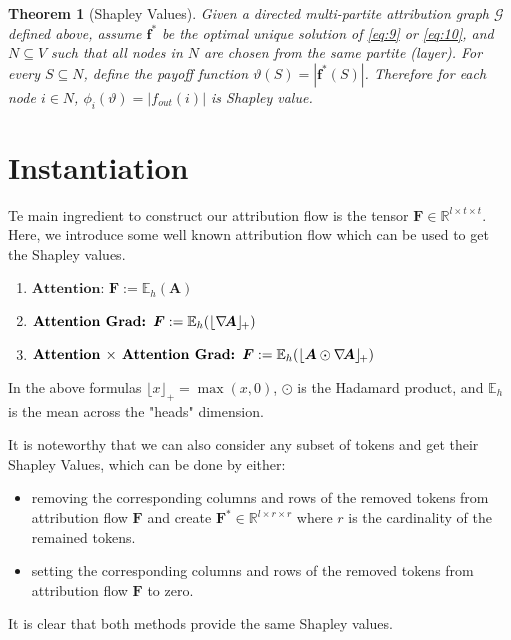 \documentclass{article} %
\theoremstyle{bfnote}
\newtheorem{theorem}{Theorem}[section]
\begin{document}
\begin{theorem}[Shapley Values]
	Given a directed multi-partite attribution graph $\mathcal{G}$ defined above, assume $\bm{f}^{\ast}$ be the optimal unique solution of \cref{eq:9}  or \cref{eq:10}, and $N \subseteq V$ such that all nodes in $N$ are chosen from the same partite (layer). For every  $S \subseteq N$, define the payoff function $\vartheta(S)=|\bm{f}^{\ast}(S)|$. Therefore for each node $i \in N$, $\phi_i(\vartheta)= |f_{out}(i)|$ is Shapley value.
\end{theorem}


\section{Instantiation}
Te main ingredient to construct our attribution flow is the tensor  $\bm{F} \in \mathbb{R}^{l \times t \times t}$. Here, we introduce some well known attribution flow which can be used to get the Shapley values.\citep{barkan2021, jain2020, chefer2021a, chefer2021d}

\begin{enumerate}
	\item $\textbf{Attention: } \bm{F} := \mathbb{E}_h(\bm{A})$
	\item $\textbf{Attention Grad: } \bm{F} := \mathbb{E}_h(\lfloor \nabla \hspace{-1.75pt} \bm{A} \rfloor_{\!+})$
	\item  $\textbf{Attention $\times$ Attention Grad: } \bm{F} := \mathbb{E}_h(\lfloor \bm{A} \odot \nabla \hspace{-1.75pt} \bm{A} \rfloor_{\!+})$
\end{enumerate}
In the above formulas $\lfloor x \rfloor_{\!+} = \max(x, 0)$, $\odot$ is the Hadamard product, and $\mathbb{E}_h$ is the mean across the "heads" dimension.

It is noteworthy that we can also consider any subset of tokens and get their Shapley Values, which can be done by either:
\begin{itemize}
	\item removing the corresponding columns and rows of the removed tokens from attribution flow $\bm{F}$ and create $\bm{F}^{\ast} \in \mathbb{R} ^{l \times r \times r }$  where $r$ is the cardinality of the remained tokens.
	
	\item setting the corresponding columns and rows of the removed tokens from attribution flow $\bm{F}$ to zero.
\end{itemize}
It is clear that both methods provide the same Shapley values.
\end{document}
